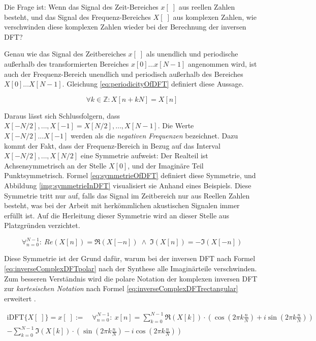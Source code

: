 Die Frage ist: Wenn das Signal des Zeit-Bereiches $x[\;]$  aus reellen Zahlen besteht, und das Signal des Frequenz-Bereiches $X[\;]$ aus komplexen Zahlen, wie \glqq verschwinden \grqq{} diese komplexen Zahlen wieder bei der Berechnung der inversen DFT? 

Genau wie das Signal des Zeitbereiches $x[\;]$ als unendlich und periodische außerhalb des transformierten Bereiches $x[0] \ldots x[N-1]$ angenommen wird, ist auch der Frequenz-Bereich unendlich und periodisch außerhalb des Bereiches $X[0] \ldots X[N-1] $. Gleichung  \ref{eq:periodicityOfDFT}  definiert diese Aussage. \cite[S. 572]{dspGuide}

\begin{equation}
\label{eq:periodicityOfDFT}
\forall k \in \mathbb{Z}: X[n+kN] = X[n]
\end{equation}

Daraus lässt sich Schlussfolgern, dass $X[-N/2] ,\ldots, X[-1] = X[N/2] ,\ldots , X[N-1]$. Die Werte $X[-N/2] ... X[-1]$ werden als die \emph{negativen Frequenzen} bezeichnet. Dazu kommt der Fakt, dass der Frequenz-Bereich in Bezug auf das Interval $X[-N/2] ,\ldots, X[N/2]$ eine Symmetrie aufweist: Der Realteil ist Achsensymmetrisch an der Stelle $X[0]$, und der Imaginäre Teil Punktsymmetrisch. Formel \ref{eq:symmetrieOfDFT} definiert diese Symmetrie, und Abbildung \ref{img:symmetrieInDFT} visualisiert sie Anhand eines Beispiels.  Diese Symmetrie tritt nur auf, falls das Signal im Zeitbereich nur aus Reellen Zahlen besteht, was bei der Arbeit mit  herkömmlichen akustischen Signalen immer erfüllt ist. Auf die Herleitung dieser Symmetrie wird an dieser Stelle aus Platzgründen verzichtet. \cite[S. 574]{dspGuide}


\begin{equation}
\label{eq:symmetrieOfDFT}
\mathop{\forall}_{n = 0}^{N-1} :\ Re (X[n]) = \Re(X[-n]) \; \wedge \; \Im (X[n]) = -\Im(X[-n]) 
\end{equation}

Diese Symmetrie ist der Grund dafür, warum bei der inversen DFT nach Formel \ref{eq:inverseComplexDFTpolar} nach der Synthese alle Imaginärteile verschwinden. Zum besseren Verständnis wird die polare Notation der komplexen inversen DFT zur \emph{kartesischen Notation} nach Formel \ref{eq:inverseComplexDFTrectangular} erweitert .\cite[S. 573]{dspGuide}

\begin{equation}
\begin{split}
\text{iDFT}\{X[\;]\} = x[\;] := \quad \mathop{\forall}_{n = 0}^{N-1} :\ x[n] =  \sum_{k = 0}^{N-1}  
\Re(X[k]) \cdot (\cos (2\pi k \frac{n}{N}) + i \sin (2 \pi k \frac{n}{N}) ) \\ 
- \sum_{k = 0}^{N-1}
\Im(X[k]) \cdot (\sin (2\pi k \frac{n}{N}) - i \cos(2 \pi k \frac{n}{N}) )
\end{split}
\label{eq:inverseComplexDFTrectangular}
\end{equation}

